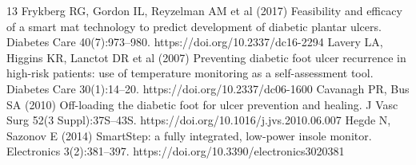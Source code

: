 \documentclass[runningheads]{llncs}
\begin{document}
\begin{thebibliography}{13}
 Frykberg RG, Gordon IL, Reyzelman AM et al (2017) Feasibility and efficacy of a smart mat technology to predict development of diabetic plantar ulcers. Diabetes Care 40(7):973--980. https://doi.org/10.2337/dc16-2294
 Lavery LA, Higgins KR, Lanctot DR et al (2007) Preventing diabetic foot ulcer recurrence in high-risk patients: use of temperature monitoring as a self-assessment tool. Diabetes Care 30(1):14--20. https://doi.org/10.2337/dc06-1600
 Cavanagh PR, Bus SA (2010) Off-loading the diabetic foot for ulcer prevention and healing. J Vasc Surg 52(3 Suppl):37S--43S. https://doi.org/10.1016/j.jvs.2010.06.007
 Hegde N, Sazonov E (2014) SmartStep: a fully integrated, low-power insole monitor. Electronics 3(2):381--397. https://doi.org/10.3390/electronics3020381
\end{thebibliography}
\end{document}
